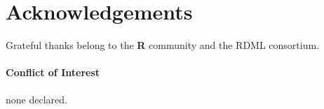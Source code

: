 \documentclass{bioinfo}
\begin{document}
\section{Acknowledgements}
Grateful thanks belong to the \textbf{R} community and the RDML consortium.
\paragraph{Conflict of Interest\textcolon} none declared.

%
%
%
%
%
%

%

\end{document}
